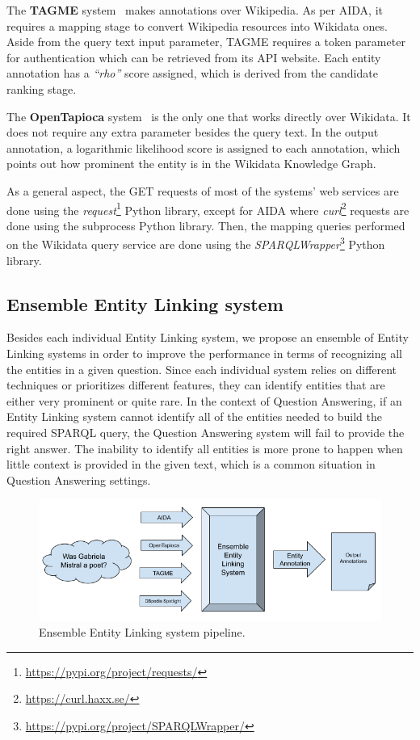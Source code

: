 The \textbf{TAGME} system~\cite{EL:tagme-FerraginaS10} makes annotations over Wikipedia. As 
per AIDA, it requires a mapping stage to convert Wikipedia resources into Wikidata ones. 
Aside from the query text input parameter, TAGME requires a token parameter for authentication 
which can be retrieved from its API website. Each entity annotation has a \textit{“rho”} score 
assigned, which is derived from the candidate ranking stage.

The \textbf{OpenTapioca} system~\cite{EL:opentapioca-Delpeuch19} is the only one that works 
directly over Wikidata. It does not require any extra parameter besides the query text. In 
the output annotation, a logarithmic likelihood score is assigned to each annotation, which 
points out how prominent the entity is in the Wikidata Knowledge Graph.

As a general aspect, the GET requests of most of the systems’ web services are done using the 
\textit{request}\footnote{\url{https://pypi.org/project/requests/}} Python library, except for AIDA 
where \textit{curl}\footnote{\url{https://curl.haxx.se/}} requests are done using the subprocess 
Python library. Then, the mapping queries performed on the Wikidata query service are done 
using the \textit{SPARQLWrapper}\footnote{\url{https://pypi.org/project/SPARQLWrapper/}} Python 
library.

\subsection{Ensemble Entity Linking system}
\label{cap3:system/entLinModule/ensembleSystems}
Besides each individual Entity Linking system, we propose an ensemble of Entity Linking systems 
in order to improve the performance in terms of recognizing all the entities in a given 
question. Since each individual system relies on different techniques or prioritizes different 
features, they can identify entities that are either very prominent or quite rare. In the 
context of Question Answering, if an Entity Linking system cannot identify all of the entities 
needed to build the required SPARQL query, the Question Answering system will fail to provide 
the right answer. The inability to identify all entities is more prone to happen when little 
context is provided in the given text, which is a common situation in Question Answering 
settings.

\begin{figure}[!h]
    \centering
    \includegraphics[scale=.45]{imagenes/3_system_overview/ensembleEntityLinkingSystem.png}
    \caption{Ensemble Entity Linking system pipeline.}
    \label{fig:esembleEntityLinking}
\end{figure}

